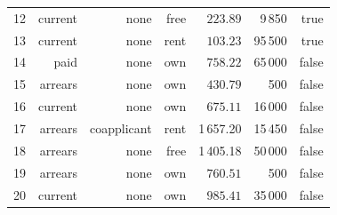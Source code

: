 \documentclass[xcolor={table}]{beamer}
\begin{document}
\begin{frame} [plain]
\begin{table}[!tb]
\begin{footnotesize}
{\begin{tabular}{crrrrrr}
12 & 	current & 	none & 	free & 	$223.89$ & 	9\,850&true\\
13 & 	current & 	none & 	rent & 	$103.23$ & 	95\,500&true\\
14 & 	paid & 	none & 	own & 	$758.22$ & 	65\,000&false\\
15 & 	arrears & 	none & 	own & 	$430.79$ & 	500&false\\
16 & 	current & 	none & 	own & 	$675.11$  & 	16\,000&false\\
17 & 	arrears & 	coapplicant & 	rent & 	1\,657.20 & 	15\,450&false\\
18 & 	arrears & 	none & 	free & 	1\,405.18 & 	50\,000&false\\
19 & 	arrears & 	none & 	own & 	$760.51$ & 	500&false\\
20 & 	current & 	none & 	own & $985.41$ & 	35\,000&false\\
\hline
\end{tabular}
}
\end{footnotesize}
\end{table}
\end{frame} 
\end{document}
